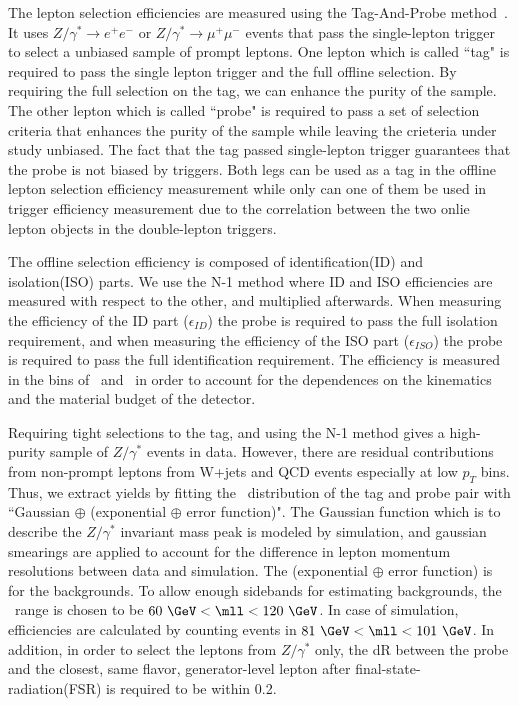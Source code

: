 The lepton selection efficiencies are measured using the Tag-And-Probe 
method~\cite{Abulencia:2005ix}. It uses 
$Z/\gamma^* \rightarrow e^+e^-$ or $Z/\gamma^* \rightarrow \mu^+\mu^-$ events 
that pass the single-lepton trigger to select a unbiased sample of prompt leptons.  
One lepton which is called ``tag" is required to pass the single lepton trigger 
and the full offline selection. By requiring the full selection on the tag, 
we can enhance the purity of the sample. The other lepton which is called 
``probe" is required to pass a set of selection criteria that enhances the purity 
of the sample while leaving the crieteria under study unbiased. The fact that the tag 
passed single-lepton trigger guarantees that the probe is not biased by triggers. 
Both legs can be used as a tag in the offline lepton selection efficiency measurement 
while only can one of them be used in trigger efficiency measurement due to the correlation 
between the two onlie lepton objects in the double-lepton triggers. 

The offline selection efficiency is composed of identification(ID) and isolation(ISO) parts. 
We use the N-1 method where ID and ISO efficiencies are measured with respect to the other, 
and multiplied afterwards. When measuring the efficiency of the ID part ($\epsilon_{ID}$) 
the probe is required to pass the full isolation requirement, and when measuring 
the efficiency of the ISO part ($\epsilon_{ISO}$) the probe is required to pass 
the full identification requirement. The efficiency is measured in the bins of 
\pt\ and \Eta\ in order to account for the dependences on the kinematics and 
the material budget of the detector. 

Requiring tight selections to the tag, and using the N-1 method gives a high-purity sample 
of $Z/\gamma^*$ events in data. However, there are residual contributions from 
non-prompt leptons from W+jets and QCD events especially at low $p_T$ bins. 
Thus, we extract yields by fitting the \mll~distribution of the tag and probe pair
with ``Gaussian $\oplus$ (exponential $\oplus$ error function)". 
The Gaussian function which is to describe the 
$Z/\gamma^*$ invariant mass peak is modeled by simulation, and 
gaussian smearings are applied to account for the difference in lepton momentum resolutions
between data and simulation. 
The (exponential $\oplus$ error function) is for the backgrounds.
To allow enough sidebands for estimating backgrounds, the \mll~range is chosen to be 
$60~\GeV < \mll < 120~\GeV$. In case of simulation, efficiencies are calculated by 
counting events in $81~\GeV < \mll < 101~\GeV$. In addition, in order to select  
the leptons from $Z/\gamma^*$ only, the dR between 
the probe and the closest, same flavor, generator-level lepton after final-state-radiation(FSR)
is required to be within 0.2.

